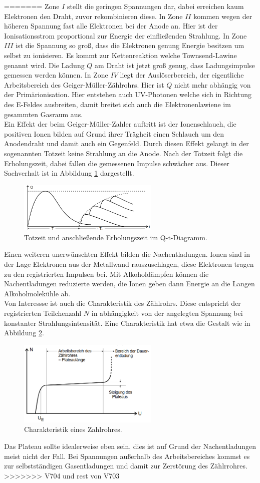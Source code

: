 =======
Zone $I$ stellt die geringen Spannungen dar, dabei erreichen kaum Elektronen den Draht, zuvor rekombinieren diese.
In Zone $II$ kommen wegen der höheren Spannung fast alle Elektronen bei der Anode an. Hier ist der Ionisationsstrom proportional
zur Energie der einfließenden Strahlung.
In Zone $III$ ist die Spannung so groß, dass die Elektronen genung Energie besitzen um selbst zu ionisieren. Es kommt zur Kettenreaktion
welche Townsend-Lawine genannt wird. Die Ladung $Q$ am Draht ist jetzt groß genug, dass Ladungsimpulse gemessen werden können.
In Zone $IV$ liegt der Auslöserbereich, der eigentliche Arbeitsbereich des Geiger-Müller-Zählrohrs. Hier ist $Q$ nicht mehr abhängig
von der Primärionisation. Hier entstehen auch UV-Photonen welche sich in Richtung des E-Feldes ausbreiten, damit breitet sich auch die
Elektronenlawiene im gesammten Gasraum aus.\\
Ein Effekt der beim Geiger-Müller-Zahler auftritt ist der Ionenschlauch, die positiven Ionen bilden auf Grund ihrer Trägheit
einen Schlauch um den Anodendraht und damit auch ein Gegenfeld. Durch diesen Effekt gelangt in der sogenannten Totzeit keine Strahlung
an die Anode. Nach der Totzeit folgt die Erholungszeit, dabei fallen die gemessenen Impulse schwächer aus. Dieser Sachverhalt ist in Abbildung
\ref{fig:totzeit} dargestellt.
\begin{figure}
  \centering
  \includegraphics[width=0.6\textwidth]{tz.PNG}
  \caption{Totzeit und anschließende Erholungszeit im Q-t-Diagramm.\cite{sample}}
  \label{fig:totzeit}
\end{figure}
Einen weiteren unerwünschten Effekt bilden die Nachentladungen. Ionen sind in der Lage Elektronen aus der Metallwand rauszuschlagen,
diese Elektronen tragen zu den registrierten Impulsen bei. Mit Alkoholdämpfen können die Nachentladungen reduzierte werden, die
Ionen geben dann Energie an die Langen Alkoholmolekühle ab.\\
Von Interessse ist auch die Charakteristik des Zählrohrs. Diese entspricht der registrierten Teilchenzahl $N$ in abhängigkeit von der
angelegten Spannung bei konstanter Strahlungsintensität. Eine Charakteristik hat etwa die Gestalt wie in Abbildung \ref{fig:char}.
\begin{figure}
  \centering
  \includegraphics[width=0.6\textwidth]{char.PNG}
  \caption{Charakteristik eines Zahlrohres.\cite{sample}}
  \label{fig:char}
\end{figure}
Das Plateau sollte idealerweise eben sein, dies ist auf Grund der Nachentladungen meist nicht der Fall.
Bei Spannungen außerhalb des Arbeitsbereiches kommst es zur selbstständigen Gasentladungen und damit zur Zerstörung des Zählrrohres.
>>>>>>> V704 und rest von V703

